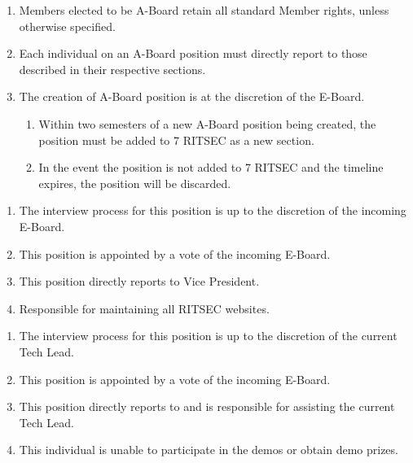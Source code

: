 

\begin{enumerate}
  \item Members elected to be A-Board retain all standard Member rights, unless otherwise specified. 
  \item Each individual on an A-Board position must directly report to those described in their respective sections.
  \item The creation of A-Board position is at the discretion of the E-Board.
  \begin{enumerate}
    \item Within two semesters of a new A-Board position being created, the position must be added to 7 RITSEC as a new section. %
    \item In the event the position is not added to 7 RITSEC and the timeline expires, the position will be discarded.
  \end{enumerate}
\end{enumerate}


\begin{enumerate}
  \item The interview process for this position is up to the discretion of the incoming E-Board. 
  \item This position is appointed by a vote of the incoming E-Board.
  \item This position directly reports to Vice President. 
  \item Responsible for maintaining all RITSEC websites.
\end{enumerate}


\begin{enumerate}
  \item The interview process for this position is up to the discretion of the current Tech Lead.
  \item This position is appointed by a vote of the incoming E-Board.
  \item This position directly reports to and is responsible for assisting the current Tech Lead.
  \item This individual is unable to participate in the demos or obtain demo prizes.
\end{enumerate}

